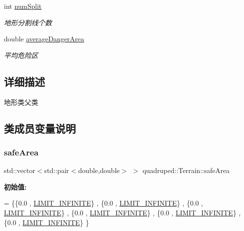 \begin{DoxyCompactItemize}
\mbox{\label{classquadruped_1_1Terrain_a59d084e80702d4b598716d67c9dd9643}} 
int \hyperlink{classquadruped_1_1Terrain_a59d084e80702d4b598716d67c9dd9643}{num\+Split}
\begin{DoxyCompactList}\small\item\em 地形分割线个数 \end{DoxyCompactList}\item 
\mbox{\label{classquadruped_1_1Terrain_af7ef7ef218c95c6421b71519e50f30c0}} 
double \hyperlink{classquadruped_1_1Terrain_af7ef7ef218c95c6421b71519e50f30c0}{average\+Danger\+Area}
\begin{DoxyCompactList}\small\item\em 平均危险区 \end{DoxyCompactList}\end{DoxyCompactItemize}


\subsection{详细描述}
地形类父类 

\subsection{类成员变量说明}
\mbox{\label{classquadruped_1_1Terrain_a69b84f242ebea84c8ef3fba2fb6a447b}} 
\subsubsection{\texorpdfstring{safe\+Area}{safeArea}}
{\footnotesize\ttfamily std\+::vector$<$std\+::pair$<$double,double$>$ $>$ quadruped\+::\+Terrain\+::safe\+Area}

{\bfseries 初始值\+:}
\begin{DoxyCode}
= \{\{0.0 , \hyperlink{commonFunction_8hpp_a0da379bb50439fd7530cd70c59cdd8ba}{LIMIT\_INFINITE}\} , 
                                                          \{0.0 , \hyperlink{commonFunction_8hpp_a0da379bb50439fd7530cd70c59cdd8ba}{LIMIT\_INFINITE}\} ,
                                                          \{0.0 , \hyperlink{commonFunction_8hpp_a0da379bb50439fd7530cd70c59cdd8ba}{LIMIT\_INFINITE}\} ,
                                                          \{0.0 , \hyperlink{commonFunction_8hpp_a0da379bb50439fd7530cd70c59cdd8ba}{LIMIT\_INFINITE}\} ,
                                                          \{0.0 , \hyperlink{commonFunction_8hpp_a0da379bb50439fd7530cd70c59cdd8ba}{LIMIT\_INFINITE}\} ,
                                                          \{0.0 , \hyperlink{commonFunction_8hpp_a0da379bb50439fd7530cd70c59cdd8ba}{LIMIT\_INFINITE}\} \}
\end{DoxyCode}


